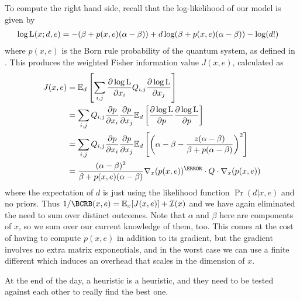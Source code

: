 \documentclass[aps,nofootinbib,twocolumn,superscriptaddress]{revtex4}
\newcommand{\mps}{x}
\newcommand{\eps}{e}
\newcommand{\data}{d}
\begin{document}
To compute the right hand side, recall that the log-likelihood of 
our model is given by
\begin{align}
    \log\Lhood(\mps;\data,\eps)
        &= -(\beta+p(\mps,\eps)(\alpha-\beta)) 
            + \data\log(\beta+p(\mps,\eps)(\alpha-\beta))
            - \log(\data!)
\end{align}
where $p(\mps,\eps)$ is the Born rule probability of the quantum 
system, as defined in \TODO.
This produces the weighted Fisher information value $J(\mps,\eps)$,
calculated as
\begin{align}
    J(\mps,\eps) &= \expect_\data \left[
            \sum_{i,j} 
            \frac{\partial\log\Lhood}{\partial\mps_i}Q_{i,j}
            \frac{\partial\log\Lhood}{\partial\mps_j} 
        \right] \nonumber \\
        &= \sum_{i,j} Q_{i,j}
        \frac{\partial p}{\partial\mps_i}
        \frac{\partial p}{\partial\mps_j}
        \expect_\data \left[
            \frac{\partial\log\Lhood}{\partial p}
            \frac{\partial\log\Lhood}{\partial p}
        \right] \nonumber \\
        &= \sum_{i,j} Q_{i,j}
        \frac{\partial p}{\partial\mps_i}
        \frac{\partial p}{\partial\mps_j}
        \expect_\data \left[
            \left(
                \alpha-\beta-\frac{z(\alpha-\beta)}{\beta+p(\alpha-\beta)}
            \right)^2
        \right] \nonumber \\
        &= \frac{(\alpha-\beta)^2}{\beta+p(\mps,\eps)(\alpha-\beta)}
            \nabla_\mps(p(\mps,\eps))^\T\cdot Q\cdot \nabla_\mps(p(\mps,\eps))
\end{align}
where the expectation of $\data$ is just using the likelihood function
$\Pr(\data|\mps,\eps)$ and no priors.
Thus $1/\BCRB(\mps,\eps)=\expect_\mps [J(\mps,\eps)]+\mathcal{I}(\mps)$
and we have again eliminated the need to sum over distinct outcomes.
Note that $\alpha$ and $\beta$ here are components of $\mps$, so we
sum over our current knowledge of them, too.
This comes at the cost of having to compute $p(\mps,\eps)$ in addition
to its gradient, but the gradient involves no extra matrix exponentials,
and in the worst case we can use a finite different which induces 
an overhead that scales in the dimension of $\mps$.

At the end of the day, a heuristic is a heuristic, and they need to 
be tested against each other to really find the best one.
\end{document}
